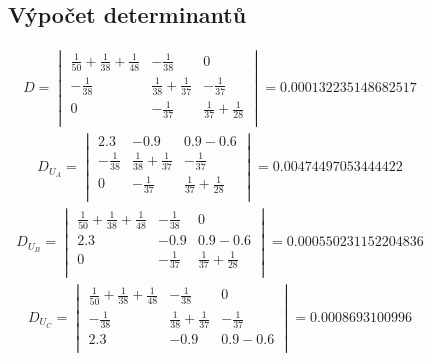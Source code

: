 \begin{figure}[h!]
    \subsection{Výpočet determinantů}
    \begin{gather*}
        D = 
        \begin{vmatrix}
            \frac{1}{50} + \frac{1}{38} + \frac{1}{48} & -\frac{1}{38} & 0 \\
            -\frac{1}{38} &  \frac{1}{38} + \frac{1}{37} & -\frac{1}{37}  \\
            0 & -\frac{1}{37} & \frac{1}{37} + \frac{1}{28} \\
        \end{vmatrix}
        = 0.000132235148682517
    \end{gather*}
    \begin{gather*}
        D_{U_{A}} =
        \begin{vmatrix}
            2.3 & -0.9 & 0.9-0.6 \\
            -\frac{1}{38} &  \frac{1}{38} + \frac{1}{37} & -\frac{1}{37}  \\
            0 & -\frac{1}{37} & \frac{1}{37} + \frac{1}{28} \\
        \end{vmatrix}
        = 0.00474497053444422
    \end{gather*}
    \begin{gather*}
        D_{U_{B}} =
        \begin{vmatrix}
            \frac{1}{50} + \frac{1}{38} + \frac{1}{48} & -\frac{1}{38} & 0 \\
            2.3 & -0.9 & 0.9-0.6 \\
            0 & -\frac{1}{37} & \frac{1}{37} + \frac{1}{28} \\
        \end{vmatrix}
        = 0.000550231152204836
    \end{gather*}
    \begin{gather*}
        D_{U_{C}} =
        \begin{vmatrix}
            \frac{1}{50} + \frac{1}{38} + \frac{1}{48} & -\frac{1}{38} & 0 \\
            -\frac{1}{38} &  \frac{1}{38} + \frac{1}{37} & -\frac{1}{37}  \\
            2.3 & -0.9 & 0.9-0.6 \\
        \end{vmatrix}
        = 0.0008693100996
    \end{gather*}
\end{figure}


